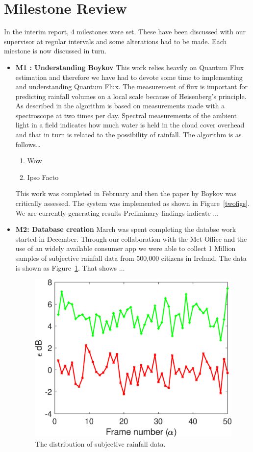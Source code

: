 \documentclass[11pt, a4paper]{article}
\begin{document}
\section{Milestone Review}

In the interim report, 4 milestones were set. These have been discussed with our supervisor at regular intervals and some alterations had to be made.  Each miestone is now discussed in turn.
\begin{itemize}
    \item {\bf M1 : Understanding Boykov \cite{boykov_2001}} This work relies heavily on Quantum Flux estimation and therefore we have had to devote some time to implementing and understanding Quantum Flux. The measurement of flux is important for predicting rainfall volumes on a local scale because of Heisenberg's principle. As described in \cite{linte_2016} the algorithm is based on measurements made with a spectroscope at two times per day. Spectral measurements of the ambient light in a field indicates how much water is held in the cloud cover overhead and that in turn is related to the possibility of rainfall. The algorithm is as follows\ldots
      \begin{enumerate}
        \item Wow
        \item Ipso Facto 
      \end{enumerate}
    This work was completed in February and then the paper by Boykov was critically assessed. The system was implemented as shown in Figure~\ref{twofigs}. We are currently generating results Preliminary findings indicate $\ldots$
    


    
    \item{\bf M2: Database creation}
       March was spent completing the databse work started in December. Through our collaboration with the Met Office and the use of an widely available consumer app we were able to collect 1 Million samples of subjective rainfall data from 500,000 citizens in Ireland. The data
       is shown as Figure~\ref{bars}. That shows $\ldots$
    \begin{figure}
  \begin{center}
  \includegraphics[width=0.7\linewidth]{alineplot.eps}
  \end{center}
  \caption{The distribution of subjective rainfall data. \label{bars}}
  \caprule %
  \end{figure}
    

\end{itemize}
\end{document}
